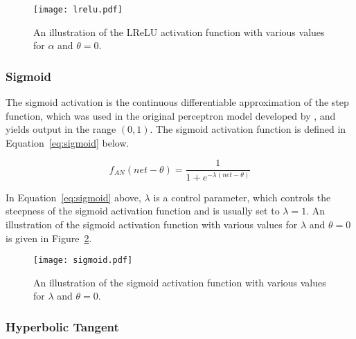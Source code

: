 \begin{figure}[htpb]
    \centering
    \texttt{[image: lrelu.pdf]}
    \caption[The \acs{LReLU} activation function]{An illustration of the \acs{LReLU} activation function with various values for $\alpha$ and $\theta = 0$.}
    \label{fig:anns:activation_functions:leaky_relu}
\end{figure}

\subsubsection{Sigmoid}\label{sec:anns:an:act_functions:sigmoid}

The sigmoid activation is the continuous differentiable approximation of the step function, which was used in the original perceptron model developed by \citeauthor{ref:rosenblatt:1957} \cite{ref:rosenblatt:1957}, and yields output in the range $(0, 1)$. The sigmoid activation function is defined in Equation~\eqref{eq:sigmoid} below.

\begin{equation}
    f_{AN}(net - \theta) = \frac{1}{1+e^{-\lambda(net - \theta)}}
    \label{eq:sigmoid}
\end{equation}

\noindent
In Equation~\eqref{eq:sigmoid} above, $\lambda$ is a control parameter, which controls the steepness of the sigmoid activation function and is usually set to $\lambda = 1$. An illustration of the sigmoid activation function with various values for $\lambda$ and $\theta = 0$ is given in Figure~\ref{fig:anns:activation_functions:sigmoid}.

\begin{figure}[htpb]
    \centering
    \texttt{[image: sigmoid.pdf]}
    \caption[The sigmoid activation function]{An illustration of the sigmoid activation function with various values for $\lambda$ and $\theta = 0$.}
    \label{fig:anns:activation_functions:sigmoid}
\end{figure}

\subsubsection{Hyperbolic Tangent}\label{sec:anns:an:act_functions:tanh}

